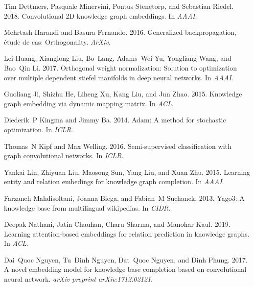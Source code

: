 \documentclass[11pt,a4paper]{article}
\begin{document}
\begin{thebibliography}{34}
Tim Dettmers, Pasquale Minervini, Pontus Stenetorp, and Sebastian Riedel. 2018.
\newblock Convolutional 2{D} knowledge graph embeddings.
\newblock In \emph{AAAI}.

Mehrtash Harandi and Basura Fernando. 2016.
\newblock Generalized backpropagation, {\'e}tude de cas: Orthogonality.
\newblock \emph{ArXiv}.

Lei Huang, Xianglong Liu, Bo~Lang, Adams~Wei Yu, Yongliang Wang, and Bao~Qin
  Li. 2017.
\newblock Orthogonal weight normalization: Solution to optimization over
  multiple dependent stiefel manifolds in deep neural networks.
\newblock In \emph{AAAI}.

Guoliang Ji, Shizhu He, Liheng Xu, Kang Liu, and Jun Zhao. 2015.
\newblock Knowledge graph embedding via dynamic mapping matrix.
\newblock In \emph{ACL}.

Diederik~P Kingma and Jimmy Ba. 2014.
\newblock Adam: A method for stochastic optimization.
\newblock In \emph{ICLR}.

Thomas~N Kipf and Max Welling. 2016.
\newblock Semi-supervised classification with graph convolutional networks.
\newblock In \emph{ICLR}.

Yankai Lin, Zhiyuan Liu, Maosong Sun, Yang Liu, and Xuan Zhu. 2015.
\newblock Learning entity and relation embedings for knowledge graph
  completion.
\newblock In \emph{AAAI}.

Farzaneh Mahdisoltani, Joanna Biega, and Fabian~M Suchanek. 2013.
\newblock Yago3: A knowledge base from multilingual wikipedias.
\newblock In \emph{CIDR}.

Deepak Nathani, Jatin Chauhan, Charu Sharma, and Manohar Kaul. 2019.
\newblock Learning attention-based embeddings for relation prediction in
  knowledge graphs.
\newblock In \emph{ACL}.

Dai~Quoc Nguyen, Tu~Dinh Nguyen, Dat~Quoc Nguyen, and Dinh Phung. 2017.
\newblock A novel embedding model for knowledge base completion based on
  convolutional neural network.
\newblock \emph{arXiv preprint arXiv:1712.02121}.


\end{thebibliography}
\end{document}
